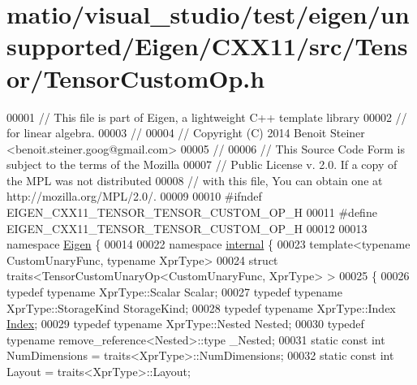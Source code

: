 \hypertarget{matio_2visual__studio_2test_2eigen_2unsupported_2_eigen_2_c_x_x11_2src_2_tensor_2_tensor_custom_op_8h_source}{}\section{matio/visual\+\_\+studio/test/eigen/unsupported/\+Eigen/\+C\+X\+X11/src/\+Tensor/\+Tensor\+Custom\+Op.h}
\label{matio_2visual__studio_2test_2eigen_2unsupported_2_eigen_2_c_x_x11_2src_2_tensor_2_tensor_custom_op_8h_source}

\begin{DoxyCode}
00001 \textcolor{comment}{// This file is part of Eigen, a lightweight C++ template library}
00002 \textcolor{comment}{// for linear algebra.}
00003 \textcolor{comment}{//}
00004 \textcolor{comment}{// Copyright (C) 2014 Benoit Steiner <benoit.steiner.goog@gmail.com>}
00005 \textcolor{comment}{//}
00006 \textcolor{comment}{// This Source Code Form is subject to the terms of the Mozilla}
00007 \textcolor{comment}{// Public License v. 2.0. If a copy of the MPL was not distributed}
00008 \textcolor{comment}{// with this file, You can obtain one at http://mozilla.org/MPL/2.0/.}
00009 
00010 \textcolor{preprocessor}{#ifndef EIGEN\_CXX11\_TENSOR\_TENSOR\_CUSTOM\_OP\_H}
00011 \textcolor{preprocessor}{#define EIGEN\_CXX11\_TENSOR\_TENSOR\_CUSTOM\_OP\_H}
00012 
00013 \textcolor{keyword}{namespace }\hyperlink{namespace_eigen}{Eigen} \{
00014 
00022 \textcolor{keyword}{namespace }\hyperlink{namespaceinternal}{internal} \{
00023 \textcolor{keyword}{template}<\textcolor{keyword}{typename} CustomUnaryFunc, \textcolor{keyword}{typename} XprType>
00024 \textcolor{keyword}{struct }traits<TensorCustomUnaryOp<CustomUnaryFunc, XprType> >
00025 \{
00026   \textcolor{keyword}{typedef} \textcolor{keyword}{typename} XprType::Scalar Scalar;
00027   \textcolor{keyword}{typedef} \textcolor{keyword}{typename} XprType::StorageKind StorageKind;
00028   \textcolor{keyword}{typedef} \textcolor{keyword}{typename} XprType::Index \hyperlink{namespace_eigen_a62e77e0933482dafde8fe197d9a2cfde}{Index};
00029   \textcolor{keyword}{typedef} \textcolor{keyword}{typename} XprType::Nested Nested;
00030   \textcolor{keyword}{typedef} \textcolor{keyword}{typename} remove\_reference<Nested>::type \_Nested;
00031   \textcolor{keyword}{static} \textcolor{keyword}{const} \textcolor{keywordtype}{int} NumDimensions = traits<XprType>::NumDimensions;
00032   \textcolor{keyword}{static} \textcolor{keyword}{const} \textcolor{keywordtype}{int} Layout = traits<XprType>::Layout;

\end{DoxyCode}
